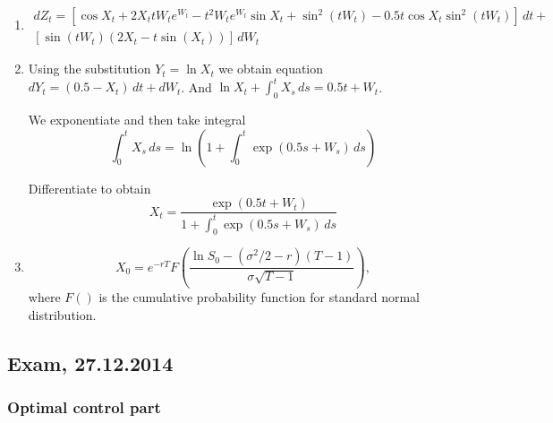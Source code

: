 \documentclass[12pt, a4paper]{article}
\begin{document}
\begin{enumerate}
\item
\begin{multline}
dZ_t=[\cos X_t+2X_t t W_t e^{W_t}-t^2W_te^{W_t}\sin X_t + \sin^2(tW_t) - 0.5t\cos X_t \sin^2(tW_t)]\,dt + \\
[\sin(tW_t)(2X_t-t\sin(X_t))]\, dW_t
\end{multline}
\item Using the substitution $Y_t=\ln X_t$ we obtain equation $dY_t=(0.5-X_t) \, dt + dW_t$. And $\ln X_t + \int_0^t X_s \, ds = 0.5t+W_t$.

We exponentiate and then take integral
\[
\int_0^t X_s \, ds=\ln \left( 1 + \int_0^t \exp(0.5s+W_s) \, ds \right)
\]

Differentiate to obtain
\[
X_t=\frac{\exp(0.5t+W_t)}{1+\int_0^t \exp(0.5s+W_s) \, ds}
\]

\item
\[
X_0=e^{-rT}F\left(  \frac{\ln S_0 - (\sigma^2/2-r)(T-1)}{\sigma \sqrt{T-1}} \right),
\]
where $F()$ is the cumulative probability function for standard normal distribution.

\end{enumerate}

\subsection{Exam, 27.12.2014}

\subsubsection*{Optimal control part}
\end{document}
